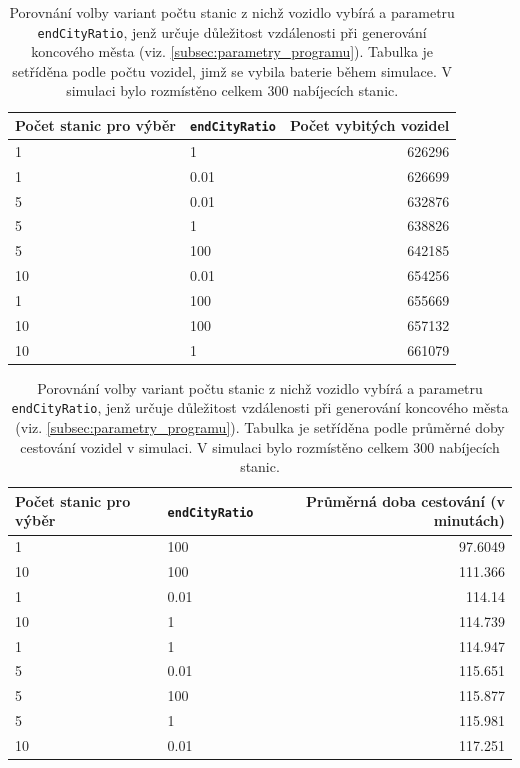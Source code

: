 \begin{table}
\centering\footnotesize\sf
\begin{tabular}{llr}
\toprule
Počet stanic pro výběr & \texttt{endCityRatio} & Počet vybitých vozidel\\
\midrule
1 & 1 & 626296 \\
1 & 0.01 & 626699 \\
5 & 0.01 & 632876 \\
5 & 1 & 638826 \\
5 & 100 & 642185 \\
10 & 0.01 & 654256 \\
1 & 100 & 655669 \\
10 & 100 & 657132 \\
10 & 1 & 661079 \\
\bottomrule
\end{tabular}
\caption{Porovnání volby variant počtu stanic z nichž vozidlo vybírá a parametru \texttt{endCityRatio},
jenž určuje důležitost vzdálenosti při generování koncového města 
(viz. \cref{subsec:parametry_programu}).
Tabulka je setříděna podle počtu vozidel, jimž se vybila baterie během simulace. V simulaci
bylo rozmístěno celkem 300 nabíjecích stanic.}
\label{tab:vyber_stanic_vybita_vozidla}
\end{table}


\begin{table}
\centering\footnotesize\sf
\begin{tabular}{llr}
\toprule
Počet stanic pro výběr & \texttt{endCityRatio} & Průměrná doba cestování (v minutách)\\
\midrule
1 & 100 & 97.6049 \\
10 & 100 & 111.366 \\
1 & 0.01 & 114.14 \\
10 & 1 & 114.739 \\
1 & 1 & 114.947 \\
5 & 0.01 & 115.651  \\
5 & 100 & 115.877  \\
5 & 1 & 115.981 \\
10 & 0.01 & 117.251 \\
\bottomrule
\end{tabular}
\caption{Porovnání volby variant počtu stanic z nichž vozidlo vybírá a parametru \texttt{endCityRatio},
jenž určuje důležitost vzdálenosti při generování koncového města 
(viz. \cref{subsec:parametry_programu}).
Tabulka je setříděna podle průměrné doby cestování vozidel v simulaci. V simulaci
bylo rozmístěno celkem 300 nabíjecích stanic.}
\label{tab:vyber_stanic_doba_cestovani}
\end{table}


